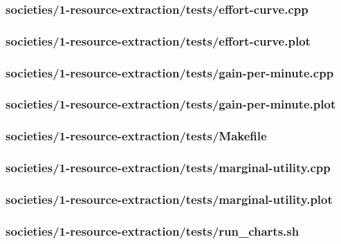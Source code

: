 \documentclass{article}
\begin{document}
\subsubsection*{societies/1-resource-extraction/tests/effort-curve.cpp}


\subsubsection*{societies/1-resource-extraction/tests/effort-curve.plot}


\subsubsection*{societies/1-resource-extraction/tests/gain-per-minute.cpp}


\subsubsection*{societies/1-resource-extraction/tests/gain-per-minute.plot}


\subsubsection*{societies/1-resource-extraction/tests/Makefile}


\subsubsection*{societies/1-resource-extraction/tests/marginal-utility.cpp}


\subsubsection*{societies/1-resource-extraction/tests/marginal-utility.plot}


\subsubsection*{societies/1-resource-extraction/tests/run\_charts.sh}

\end{document}
